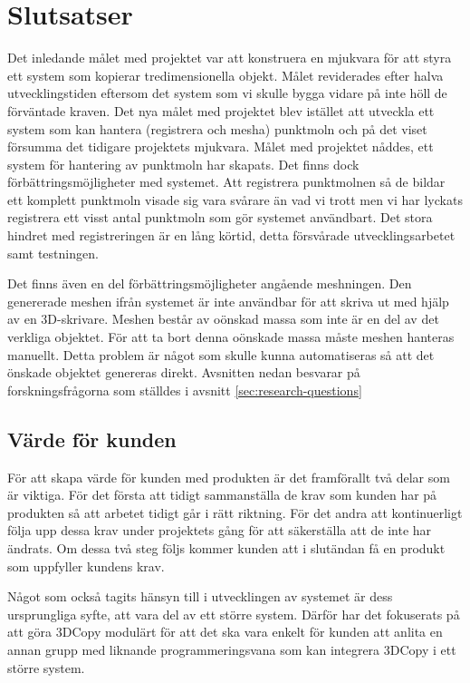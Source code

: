 \chapter{Slutsatser}
\label{cha:conclusion}
Det inledande målet med projektet var att konstruera en mjukvara för att styra ett system som kopierar tredimensionella objekt. Målet reviderades efter halva utvecklingstiden eftersom det system som vi skulle bygga vidare på inte höll de förväntade kraven. Det nya målet med projektet blev istället att utveckla ett system som kan hantera (registrera och mesha) punktmoln och på det viset försumma det tidigare projektets mjukvara. Målet med projektet nåddes, ett system för hantering av punktmoln har skapats. Det finns dock förbättringsmöjligheter med systemet. Att registrera punktmolnen så de bildar ett komplett punktmoln visade sig vara svårare än vad vi trott men vi har lyckats registrera ett visst antal punktmoln som gör systemet användbart. Det stora hindret med registreringen är en lång körtid, detta försvårade utvecklingsarbetet samt testningen. 

Det finns även en del förbättringsmöjligheter angående meshningen. Den genererade meshen ifrån systemet är inte användbar för att skriva ut med hjälp av en 3D-skrivare. Meshen består av oönskad massa som inte är en del av det verkliga objektet. För att ta bort denna oönskade massa måste meshen hanteras manuellt. Detta problem är något som skulle kunna automatiseras så att det önskade objektet genereras direkt. Avsnitten nedan besvarar på forskningsfrågorna som ställdes i avsnitt \ref{sec:research-questions}

\section{Värde för kunden}

För att skapa värde för kunden med produkten är det framförallt två delar som är viktiga. För det första att tidigt sammanställa de krav som kunden har på produkten så att arbetet tidigt går i rätt riktning. För det andra att kontinuerligt följa upp dessa krav under projektets gång för att säkerställa att de inte har ändrats. Om dessa två steg följs kommer kunden att i slutändan få en produkt som uppfyller kundens krav.

Något som också tagits hänsyn till i utvecklingen av systemet är dess ursprungliga syfte, att vara del av ett större system. Därför har det fokuserats på att göra 3DCopy modulärt för att det ska vara enkelt för kunden att anlita en annan grupp med liknande programmeringsvana som kan integrera 3DCopy i ett större system.

